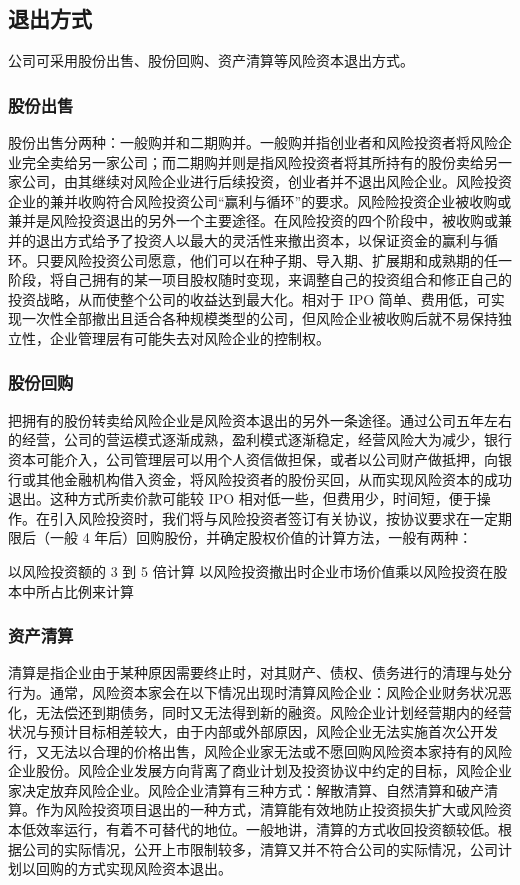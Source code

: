 \documentclass[violet]{main}
\begin{document}
			\subsection{退出方式}
				公司可采用股份出售、股份回购、资产清算等风险资本退出方式。
				\subsubsection{股份出售}
					股份出售分两种：一般购并和二期购并。一般购并指创业者和风险投资者将风险企业完全卖给另一家公司；而二期购并则是指风险投资者将其所持有的股份卖给另一家公司，由其继续对风险企业进行后续投资，创业者并不退出风险企业。风险投资企业的兼并收购符合风险投资公司“赢利与循环”的要求。风险险投资企业被收购或兼并是风险投资退出的另外一个主要途径。在风险投资的四个阶段中，被收购或兼并的退出方式给予了投资人以最大的灵活性来撤出资本，以保证资金的赢利与循环。只要风险投资公司愿意，他们可以在种子期、导入期、扩展期和成熟期的任一阶段，将自己拥有的某一项目股权随时变现，来调整自己的投资组合和修正自己的投资战略，从而使整个公司的收益达到最大化。相对于 IPO 简单、费用低，可实现一次性全部撤出且适合各种规模类型的公司，但风险企业被收购后就不易保持独立性，企业管理层有可能失去对风险企业的控制权。
				\subsubsection{股份回购}
					把拥有的股份转卖给风险企业是风险资本退出的另外一条途径。通过公司五年左右的经营，公司的营运模式逐渐成熟，盈利模式逐渐稳定，经营风险大为减少，银行资本可能介入，公司管理层可以用个人资信做担保，或者以公司财产做抵押，向银行或其他金融机构借入资金，将风险投资者的股份买回，从而实现风险资本的成功退出。这种方式所卖价款可能较 IPO 相对低一些，但费用少，时间短，便于操作。在引入风险投资时，我们将与风险投资者签订有关协议，按协议要求在一定期限后（一般 4 年后）回购股份，并确定股权价值的计算方法，一般有两种：
					\begin{center}
						\begin{tcolorbox}[title = {确定股权价值的计算方法}]
							以风险投资额的 3 到 5 倍计算
							\tcblower
							以风险投资撤出时企业市场价值乘以风险投资在股本中所占比例来计算
						\end{tcolorbox}
					\end{center}
				\subsubsection{资产清算}
					清算是指企业由于某种原因需要终止时，对其财产、债权、债务进行的清理与处分行为。通常，风险资本家会在以下情况出现时清算风险企业：风险企业财务状况恶化，无法偿还到期债务，同时又无法得到新的融资。风险企业计划经营期内的经营状况与预计目标相差较大，由于内部或外部原因，风险企业无法实施首次公开发行，又无法以合理的价格出售，风险企业家无法或不愿回购风险资本家持有的风险企业股份。风险企业发展方向背离了商业计划及投资协议中约定的目标，风险企业家决定放弃风险企业。风险企业清算有三种方式：解散清算、自然清算和破产清算。作为风险投资项目退出的一种方式，清算能有效地防止投资损失扩大或风险资本低效率运行，有着不可替代的地位。一般地讲，清算的方式收回投资额较低。根据公司的实际情况，公开上市限制较多，清算又并不符合公司的实际情况，公司计划以回购的方式实现风险资本退出。
\end{document}
